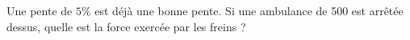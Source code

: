 

\begin{exercice}\label{exo026}

Une pente de $5\%$ est déjà une bonne pente. Si une ambulance de \unit{500}{\kilogram} est arrêtée dessus, quelle est la force exercée par les freins ?
\end{exercice}
